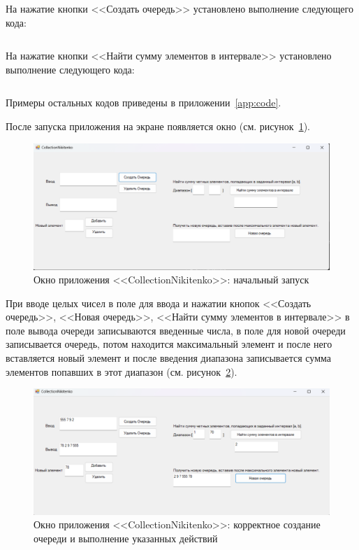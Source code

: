 \documentclass[bachelor, och, pract, times]{SCWorks}
\begin{document}
На нажатие кнопки <<Создать очередь>> установлено выполнение следующего кода:
\inputminted[fontsize=\footnotesize]{cpp}{Колекции/CreateQ.cpp}

На нажатие кнопки <<Найти сумму элементов в интервале>> установлено выполнение следующего кода:
\inputminted[fontsize=\footnotesize]{cpp}{Колекции/Interval.cpp}

Примеры остальных кодов приведены в приложении~\ref{app:code}.

После запуска приложения на экране появляется окно (см. рисунок~\ref{fig:queue-02}).

\begin{figure}[H]
    \centering
    \includegraphics[scale=0.5]{Скрины/Снимок экрана 2025-01-05 205837.png}
    \caption{Окно приложения <<CollectionNikitenko>>: начальный запуск}\label{fig:queue-02}
\end{figure}

При вводе целых чисел в поле для ввода и нажатии кнопок <<Создать очередь>>, <<Новая очередь>>, <<Найти сумму элементов в интервале>> в поле вывода очереди записываются введенные числа, в поле для новой очереди записывается очередь, потом находится максимальный элемент и после него вставляется новый элемент и после введения диапазона записывается сумма элементов попавших в этот диапазон (см. рисунок~\ref{fig:queue-03}).

\begin{figure}[H]
    \centering
    \includegraphics[scale=0.5]{Скрины/Снимок экрана 2025-01-05 212210.png}
    \caption{Окно приложения <<CollectionNikitenko>>: корректное создание очереди и выполнение указанных действий}\label{fig:queue-03}
\end{figure}
\end{document}
